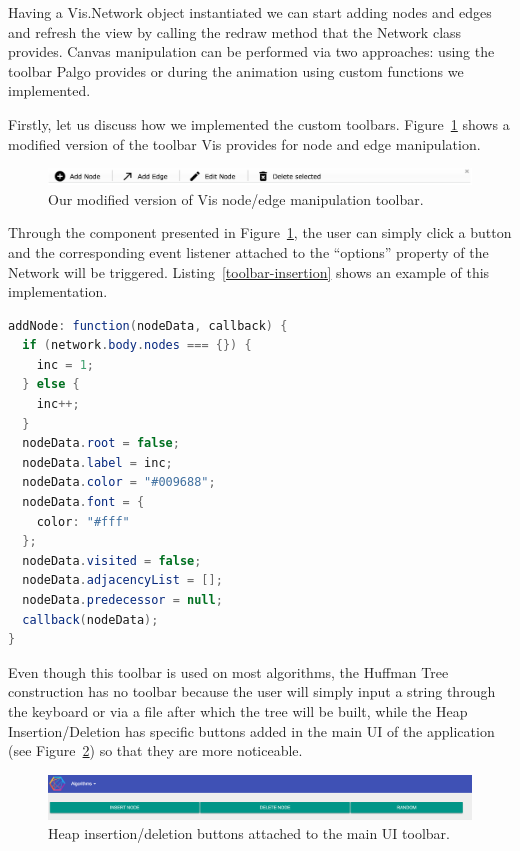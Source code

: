 \documentclass{l4proj}
\begin{document}
Having a Vis.Network object instantiated we can start adding nodes and edges and refresh the view by calling the redraw method that the Network class provides. Canvas manipulation can be performed via two approaches: using the toolbar
Palgo provides or during the animation using custom functions we implemented. 

Firstly, let us discuss how we implemented the custom toolbars. Figure~\ref{fig:palgo-toolbar} shows a modified version
of the toolbar Vis provides for node and edge
manipulation.

\begin{figure}[!ht]
\centering
\includegraphics[scale=0.5]{palgo-toolbar}
\caption{Our modified version of Vis node/edge manipulation toolbar.}
\label{fig:palgo-toolbar}
\end{figure}

Through the component presented in Figure~\ref{fig:palgo-toolbar}, the user can simply click a button and the
corresponding
event listener attached to the ``options'' property of the Network will be triggered. Listing~\ref{toolbar-insertion} shows an example of this implementation.

\begin{lstlisting}[language={Java}, label={toolbar-insertion},caption={Custom event listener that adds node to the
graph when the user clicks the ``Add Node'' button.}]
addNode: function(nodeData, callback) {
  if (network.body.nodes === {}) {
    inc = 1;
  } else {
    inc++;
  }
  nodeData.root = false;
  nodeData.label = inc;
  nodeData.color = "#009688";
  nodeData.font = {
    color: "#fff"
  };
  nodeData.visited = false;
  nodeData.adjacencyList = [];
  nodeData.predecessor = null;
  callback(nodeData);
}
\end{lstlisting}

Even though this toolbar is used on most algorithms, the Huffman Tree construction has no toolbar because the user will simply input a string through the keyboard or via a file after which the tree will be built, while the Heap Insertion/Deletion has specific buttons added in the main UI of the application (see Figure~\ref{fig:heap-toolbar}) so that they are more noticeable.

\pagebreak

\begin{figure}[!ht]
\centering
\includegraphics[scale=0.3]{heap-toolbar}
\caption{Heap insertion/deletion buttons attached to the main UI toolbar.}
\label{fig:heap-toolbar}
\end{figure}
\end{document}

